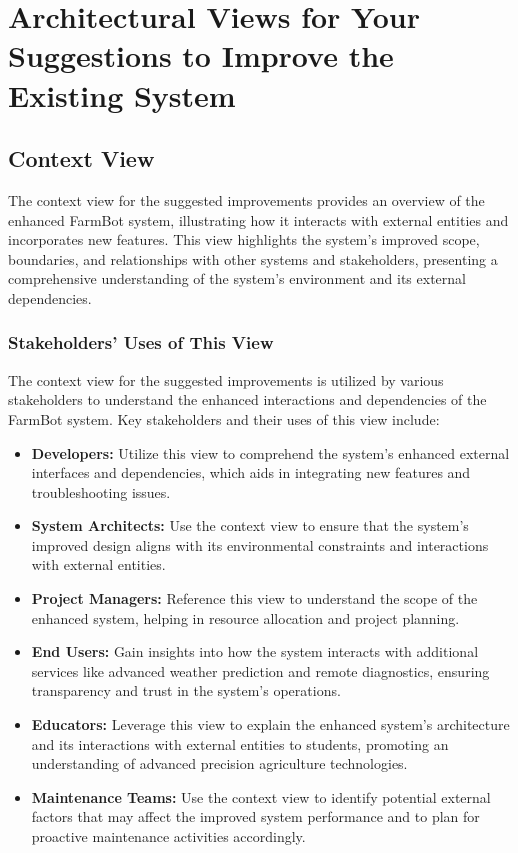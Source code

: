 \chapter{Architectural Views for Your Suggestions to Improve the Existing System} \label{suggest}

\section{Context View}

The context view for the suggested improvements provides an overview of the enhanced FarmBot system, illustrating how it interacts with external entities and incorporates new features. This view highlights the system's improved scope, boundaries, and relationships with other systems and stakeholders, presenting a comprehensive understanding of the system's environment and its external dependencies.


\subsection{Stakeholders’ Uses of This View}

The context view for the suggested improvements is utilized by various stakeholders to understand the enhanced interactions and dependencies of the FarmBot system. Key stakeholders and their uses of this view include:

\begin{itemize}
    \item \textbf{Developers:} Utilize this view to comprehend the system's enhanced external interfaces and dependencies, which aids in integrating new features and troubleshooting issues.
    \item \textbf{System Architects:} Use the context view to ensure that the system's improved design aligns with its environmental constraints and interactions with external entities.
    \item \textbf{Project Managers:} Reference this view to understand the scope of the enhanced system, helping in resource allocation and project planning.
    \item \textbf{End Users:} Gain insights into how the system interacts with additional services like advanced weather prediction and remote diagnostics, ensuring transparency and trust in the system's operations.
    \item \textbf{Educators:} Leverage this view to explain the enhanced system's architecture and its interactions with external entities to students, promoting an understanding of advanced precision agriculture technologies.
    \item \textbf{Maintenance Teams:} Use the context view to identify potential external factors that may affect the improved system performance and to plan for proactive maintenance activities accordingly.
\end{itemize}

